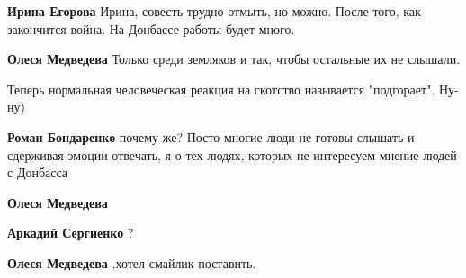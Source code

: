 \begin{itemize}
\begin{itemize}
\textbf{Ирина Егорова} Ирина, совесть трудно отмыть, но можно. После того, как закончится война. На Донбассе работы будет много.

 
\textbf{Олеся Медведева} Только среди земляков и так, чтобы остальные их не слышали.

 
Теперь нормальная человеческая реакция на скотство называется "подгорает". Ну-ну)

 
\textbf{Роман Бондаренко} почему же? Посто многие люди не готовы слышать и сдерживая эмоции отвечать, я о тех людях, которых не интересуем мнение людей с Донбасса

 
\textbf{Олеся Медведева}

 
\textbf{Аркадий Сергиенко} ?

 
\textbf{Олеся Медведева} ,хотел смайлик поставить.


\end{itemize}
\end{itemize}
